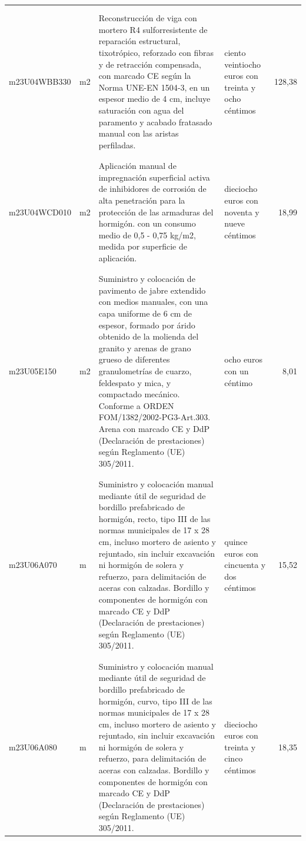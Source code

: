 \documentclass{book}%
\begin{document}
\begin{longtable}{|l|l|p{5cm}|p{3cm}|r|}
&&&&\\%
&&&&\\%
m23U04WBB330&m2&Reconstrucción de viga con mortero R4 sulforresistente de reparación estructural, tixotrópico, reforzado con fibras y de retracción compensada, con marcado CE según la Norma UNE{-}EN 1504{-}3, en un espesor medio de 4 cm, incluye saturación con agua del paramento y acabado fratasado manual con las aristas perfiladas.&ciento veintiocho euros con treinta y ocho céntimos&128,38\\%
&&&&\\%
&&&&\\%
m23U04WCD010&m2&Aplicación manual de impregnación superficial activa de inhibidores de corrosión de alta penetración para la protección de las armaduras del hormigón. con un consumo medio de 0,5 {-} 0,75 kg/m2, medida por superficie de aplicación.&dieciocho euros con noventa y nueve céntimos&18,99\\%
&&&&\\%
&&&&\\%
m23U05E150&m2&Suministro y colocación de pavimento de jabre extendido con medios manuales, con una capa uniforme de 6 cm de espesor, formado por árido obtenido de la molienda del granito y arenas de grano grueso de diferentes granulometrías de cuarzo, feldespato y mica, y compactado mecánico. Conforme a ORDEN FOM/1382/2002{-}PG3{-}Art.303. Arena con marcado CE y DdP (Declaración de prestaciones) según Reglamento (UE) 305/2011.&ocho euros con un céntimo&8,01\\%
&&&&\\%
&&&&\\%
m23U06A070&m&Suministro y colocación manual mediante útil de seguridad de bordillo prefabricado de hormigón, recto, tipo III de las normas municipales de 17 x 28 cm, incluso mortero de asiento y rejuntado, sin incluir excavación ni hormigón de solera y refuerzo, para delimitación de aceras con calzadas. Bordillo y componentes de hormigón con marcado CE y DdP (Declaración de prestaciones) según Reglamento (UE) 305/2011.&quince euros con cincuenta y dos céntimos&15,52\\%
&&&&\\%
&&&&\\%
m23U06A080&m&Suministro y colocación manual mediante útil de seguridad de bordillo prefabricado de hormigón, curvo, tipo III de las normas municipales de 17 x 28 cm, incluso mortero de asiento y rejuntado, sin incluir excavación ni hormigón de solera y refuerzo, para delimitación de aceras con calzadas. Bordillo y componentes de hormigón con marcado CE y DdP (Declaración de prestaciones) según Reglamento (UE) 305/2011.&dieciocho euros con treinta y cinco céntimos&18,35\\%

\end{longtable}
\end{document}
